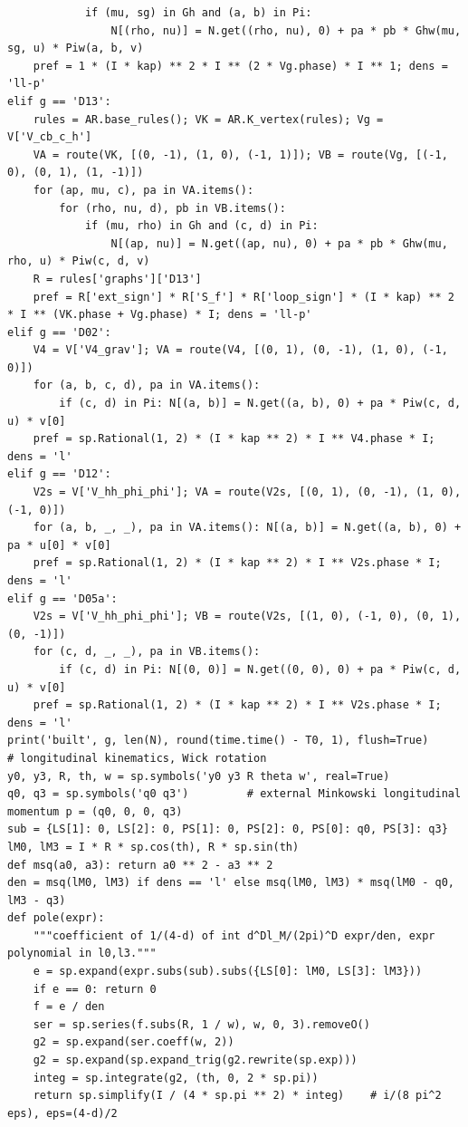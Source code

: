 \documentclass[10pt]{article}
\begin{document}
\begin{lstlisting}
            if (mu, sg) in Gh and (a, b) in Pi:
                N[(rho, nu)] = N.get((rho, nu), 0) + pa * pb * Ghw(mu, sg, u) * Piw(a, b, v)
    pref = 1 * (I * kap) ** 2 * I ** (2 * Vg.phase) * I ** 1; dens = 'll-p'
elif g == 'D13':
    rules = AR.base_rules(); VK = AR.K_vertex(rules); Vg = V['V_cb_c_h']
    VA = route(VK, [(0, -1), (1, 0), (-1, 1)]); VB = route(Vg, [(-1, 0), (0, 1), (1, -1)])
    for (ap, mu, c), pa in VA.items():
        for (rho, nu, d), pb in VB.items():
            if (mu, rho) in Gh and (c, d) in Pi:
                N[(ap, nu)] = N.get((ap, nu), 0) + pa * pb * Ghw(mu, rho, u) * Piw(c, d, v)
    R = rules['graphs']['D13']
    pref = R['ext_sign'] * R['S_f'] * R['loop_sign'] * (I * kap) ** 2 * I ** (VK.phase + Vg.phase) * I; dens = 'll-p'
elif g == 'D02':
    V4 = V['V4_grav']; VA = route(V4, [(0, 1), (0, -1), (1, 0), (-1, 0)])
    for (a, b, c, d), pa in VA.items():
        if (c, d) in Pi: N[(a, b)] = N.get((a, b), 0) + pa * Piw(c, d, u) * v[0]
    pref = sp.Rational(1, 2) * (I * kap ** 2) * I ** V4.phase * I; dens = 'l'
elif g == 'D12':
    V2s = V['V_hh_phi_phi']; VA = route(V2s, [(0, 1), (0, -1), (1, 0), (-1, 0)])
    for (a, b, _, _), pa in VA.items(): N[(a, b)] = N.get((a, b), 0) + pa * u[0] * v[0]
    pref = sp.Rational(1, 2) * (I * kap ** 2) * I ** V2s.phase * I; dens = 'l'
elif g == 'D05a':
    V2s = V['V_hh_phi_phi']; VB = route(V2s, [(1, 0), (-1, 0), (0, 1), (0, -1)])
    for (c, d, _, _), pa in VB.items():
        if (c, d) in Pi: N[(0, 0)] = N.get((0, 0), 0) + pa * Piw(c, d, u) * v[0]
    pref = sp.Rational(1, 2) * (I * kap ** 2) * I ** V2s.phase * I; dens = 'l'
print('built', g, len(N), round(time.time() - T0, 1), flush=True)
# longitudinal kinematics, Wick rotation
y0, y3, R, th, w = sp.symbols('y0 y3 R theta w', real=True)
q0, q3 = sp.symbols('q0 q3')         # external Minkowski longitudinal momentum p = (q0, 0, 0, q3)
sub = {LS[1]: 0, LS[2]: 0, PS[1]: 0, PS[2]: 0, PS[0]: q0, PS[3]: q3}
lM0, lM3 = I * R * sp.cos(th), R * sp.sin(th)
def msq(a0, a3): return a0 ** 2 - a3 ** 2
den = msq(lM0, lM3) if dens == 'l' else msq(lM0, lM3) * msq(lM0 - q0, lM3 - q3)
def pole(expr):
    """coefficient of 1/(4-d) of int d^Dl_M/(2pi)^D expr/den, expr polynomial in l0,l3."""
    e = sp.expand(expr.subs(sub).subs({LS[0]: lM0, LS[3]: lM3}))
    if e == 0: return 0
    f = e / den
    ser = sp.series(f.subs(R, 1 / w), w, 0, 3).removeO()
    g2 = sp.expand(ser.coeff(w, 2))
    g2 = sp.expand(sp.expand_trig(g2.rewrite(sp.exp)))
    integ = sp.integrate(g2, (th, 0, 2 * sp.pi))
    return sp.simplify(I / (4 * sp.pi ** 2) * integ)    # i/(8 pi^2 eps), eps=(4-d)/2

\end{lstlisting}
\end{document}
